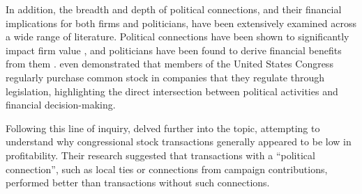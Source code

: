 \documentclass[15pt,letterpaper]{article}
\begin{document}
In addition, the breadth and depth of political connections, and their financial implications for both firms and politicians, have been extensively examined across a wide range of literature.  Political connections have been shown to significantly impact firm value \citep{roberts1990,khwaja2005,goldman2009}, and politicians have been found to derive financial benefits from them \citep{diermeier2005,lim2009,querubin2013}. \cite{boller1995} even demonstrated that members of the United States Congress regularly purchase common stock in companies that they regulate through legislation, highlighting the direct intersection between political activities and financial decision-making.

Following this line of inquiry, \cite{eg14} delved further into the topic, attempting to understand why congressional stock transactions generally appeared to be low in profitability. Their research suggested that transactions with a ``political connection'', such as local ties or connections from campaign contributions, performed better than transactions without such connections. 
\end{document}
